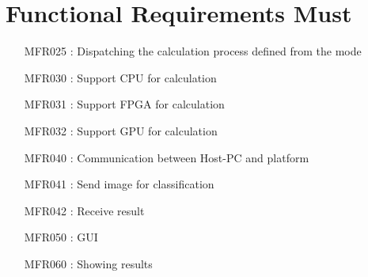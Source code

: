 \documentclass[parskip=full]{scrartcl}
\begin{document}
\section{Functional Requirements Must}
\begin{itemize}[nosep]
\item [MFR025]: Dispatching the calculation process defined from the mode
\item [MFR030]: Support CPU for calculation
\item [MFR031]: Support FPGA for calculation
\item [MFR032]: Support GPU for calculation
\item [MFR040]: Communication between Host-PC and platform
\item [MFR041]: Send image for classification
\item [MFR042]: Receive result
\item [MFR050]: GUI
\item [MFR060]: Showing results
\end{itemize}
\end{document}
